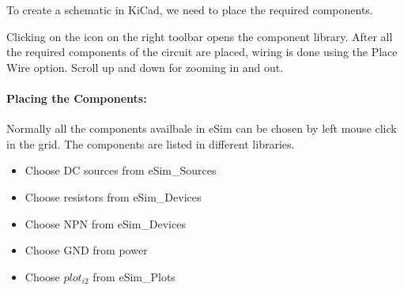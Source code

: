 To create a schematic in KiCad, we need to place the required components. %


 Clicking on the icon on the right toolbar opens the component library. After all the required components of the circuit are placed, wiring is
done using the Place Wire option. %
 Scroll up and down for zooming in and out.




\paragraph{Placing the Components:} Normally all the components availbale in eSim can be chosen by left mouse click in the grid. The components are listed in different libraries. %


\begin{itemize}
\item
Choose DC sources from eSim\_Sources
\item
Choose resistors from eSim\_Devices
\item
Choose NPN from eSim\_Devices
\item
Choose GND from power
\item
Choose $plot_{i2}$  from eSim\_Plots
\end{itemize}

